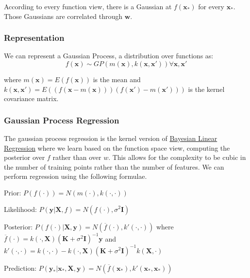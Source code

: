 \documentclass[12pt]{article}
\begin{document}
            According to every function view, there is a Gaussian at $f(\boldsymbol{x}_*)$ for every $\boldsymbol{x}_*$.
            Those Gaussians are correlated through $\boldsymbol{w}$.
            
        \subsubsection{Representation}
            We can represent a Gaussian Process, a distribution over functions as:
            $$ f(\boldsymbol{x}) \sim GP(m(\boldsymbol{x}), k(\boldsymbol{x}, \boldsymbol{x}')) \forall \boldsymbol{x},
            \boldsymbol{x}' $$

            where $ m(\boldsymbol{x}) = E(f(\boldsymbol{x})) $ is the mean and $k(\boldsymbol{x}, \boldsymbol{x}') =
            E((f(\boldsymbol{x} - m(\boldsymbol{x})))(f(\boldsymbol{x}')-m(\boldsymbol{x}')))$ is the kernel covariance
            matrix.
        
        \subsubsection{Gaussian Process Regression}
            The gaussian process regression is the kernel version of \hyperref[sec:BayesianLinearRegression]{Bayesian
            Linear Regression} where we learn based on the function space view, computing the posterior over $f$ rather
            than over $w$. This allows for the complexity to be cubic in the number of training points rather than the
            number of features. We can perform regression using the following formulae.

            Prior: $P(f(\cdot)) = N(m(\cdot),k(\cdot,\cdot))$
            
            Likelihood: $P(\boldsymbol{y}|\boldsymbol{X},f) = N(f(\cdot), \sigma^2 \boldsymbol{I})$

            Posterior: $P(f(\cdot)|\boldsymbol{X},\boldsymbol{y}) = N(\overline{f}(\cdot), k'(\cdot, \cdot))$ where \\
            $\overline{f}(\cdot) = k(\cdot,\boldsymbol{X})(\boldsymbol{K}+\sigma^2\boldsymbol{I})^{-1}\boldsymbol{y}$ and \\
            $k'(\cdot,\cdot)=k(\cdot,\cdot)-k(\cdot,\boldsymbol{X})(\boldsymbol{K}+\sigma^2\boldsymbol{I})^{-1}k(\boldsymbol{X},\cdot)$
            
            Prediction: $P(\boldsymbol{y}_*|\boldsymbol{x}_*, \boldsymbol{X}, \boldsymbol{y}) = N(\overline{f}(\boldsymbol{x}_*), k'(\boldsymbol{x}_*, \boldsymbol{x}_*))$
\end{document}
